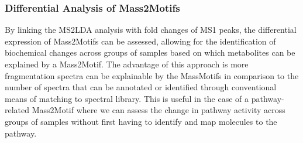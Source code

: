 

\subsubsection{Differential Analysis of Mass2Motifs}

By linking the MS2LDA analysis with fold changes of MS1 peaks, the differential expression of Mass2Motifs can be assessed, allowing for the identification of biochemical changes across groups of samples based on which metabolites can be explained by a Mass2Motif. The advantage of this approach is more fragmentation spectra can be explainable by the MassMotifs in comparison to the number of spectra that can be annotated or identified through conventional means of matching to spectral library. This is useful in the case of a pathway-related Mass2Motif where we can assess the change in pathway activity across groups of samples without first having to identify and map molecules to the pathway.

